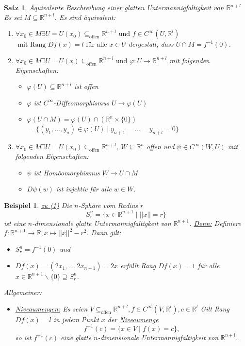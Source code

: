 \documentclass[a4paper,11pt,notitlepage]{report}
\newtheorem{theorem}{Satz}[chapter]
\newtheorem{example}{Beispiel}[chapter]
\newcommand{\R}{{\ensuremath{\mathbb{R}}}}
\begin{document}

\begin{theorem}{Äquivalente Beschreibung einer glatten Untermannigfaltigkeit von $\R^{n+l}$}
	Es sei $M \subseteq \R^{n+l}$. Es sind äquivalent:
	\begin{enumerate}
		\item $\forall x_0 \in M \exists U = U(x_0) \subseteq_{\text{offen}} \R^{n+l} \text{ und } f \in C^\infty(U,\R^l)$ $\text{ mit Rang }Df(x) = l \text{ für alle } x \in U$ dergestalt, dass $U \cap M = f^{-1}(0)$.
		\item $\forall x_0 \in M \exists U = U(x) \subseteq_{\text{offen}} \R^{n+l} \text{ und } \varphi \colon U \rightarrow \R^{n+l}$ mit folgenden Eigenschaften:
			\begin{itemize}
				\item $\varphi(U) \subseteq \R^{n+l}$ ist offen
				\item $\varphi$ ist $C^\infty$-Diffeomorphismus $U \rightarrow \varphi(U)$
				\item $\varphi(U \cap M) = \varphi(U) \cap (\R^n \times \{0\})$ $= \{(y_1, \ldots, y_n) \in \varphi(U) \mid y_{n+1} = \ldots = y_{n+l} = 0\}$
			\end{itemize}
		\item $\forall x_0 \in M \exists U = U(x_0) \subseteq_{\text{offen}} \R^{n+l}$, $W \subseteq \R^n$ offen und $\psi \in C^\infty(W,U)$ mit folgenden Eigenschaften:
			\begin{itemize}
				\item $\psi$ ist Homöomorphismus $W \rightarrow U \cap M$
				\item $D\psi(w)$ ist injektiv für alle $w \in W$.
			\end{itemize}
	\end{enumerate}
\end{theorem}

\begin{example}
	\underline{zu (1)}
	\newline
	Die $n$-Sphäre vom Radius $r$
	$$S_r^n = \{x \in \R^{n+1} \mid ||x|| = r\}$$
	ist eine $n$-dimensionale glatte Untermannigfaltigkeit von $\R^{n+1}$.
	\newline
	\underline{Denn:}
	Definiere $f \colon \R^{n+1} \rightarrow \R, x \mapsto ||x||^2 - r^2$.
	Dann gilt:
	\begin{itemize}
		\item $S_r^n = f^{-1}(0)$ und
		\item $Df(x) = (2x_1, \ldots, 2x_{n+1}) = 2x$
	erfüllt Rang $Df(x)=1$ für alle $x \in \R^{n+1}\backslash\{0\} \supseteq S_r^n$.
		\end{itemize}
		
	Allgemeiner:
	\begin{itemize}
		\item \underline{Niveaumengen:}
			Es seien $V \subseteq_{\text{offen}} \R^{n+l}, f \in C^\infty(V, \R^l), c \in \R^l$
			Gilt Rang $Df(x) = l$ in jedem Punkt $x$ der \underline{Niveaumenge} $$f^{-1}(c)=\{x \in V \mid f(x)=c\},$$ so ist $f^{-1}(c)$ eine glatte $n$-dimensionale Untermannigfaltigkeit von $\R^{n+l}$.
	\end{itemize}
\end{example}
\end{document}

